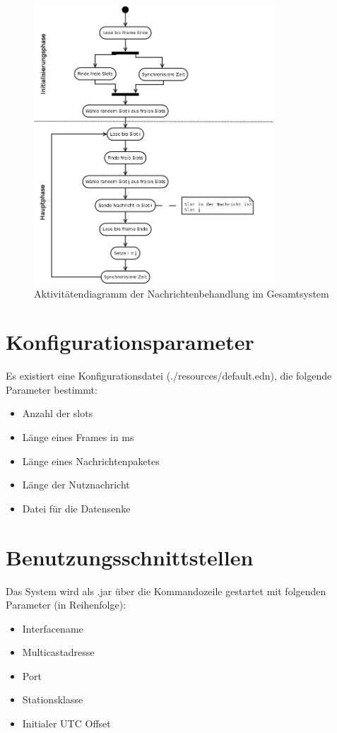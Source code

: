 \documentclass[draft=false
              ,paper=a4
              ,twoside=false
              ,fontsize=11pt
              ,headsepline
              ,BCOR10mm
              ,DIV11
              ]{scrbook}
\begin{document}
\begin{figure}[h]
\centering
\includegraphics[width=0.8\textwidth]{activity-diagram.png}
\caption[activity-diagram]{Aktivitätendiagramm der Nachrichtenbehandlung im Gesamtsystem}
\label{fig:component-diagram}
\end{figure}

\section{Konfigurationsparameter}
Es existiert eine Konfigurationsdatei (./resources/default.edn), die folgende Parameter bestimmt:
\begin{itemize}
	\item Anzahl der slots
	\item Länge eines Frames in ms
	\item Länge eines Nachrichtenpaketes
	\item Länge der Nutznachricht
	\item Datei für die Datensenke
\end{itemize}

\section{Benutzungsschnittstellen}
Das System wird als .jar über die Kommandozeile gestartet mit folgenden Parameter (in Reihenfolge):
\begin{itemize}
	\item Interfacename 
	\item Multicastadresse
	\item Port
	\item Stationsklasse
	\item Initialer UTC Offset
\end{itemize}
\end{document}
